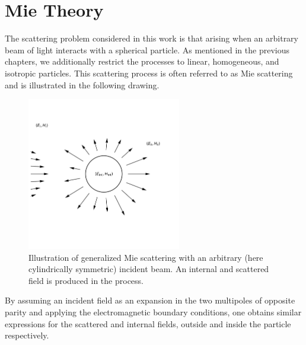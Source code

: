 \section{Mie Theory}

The scattering problem considered in this work is that arising when an arbitrary beam of light interacts with a spherical particle. As mentioned in the previous chapters, we additionally restrict the processes to linear, homogeneous, and isotropic particles. This scattering process is often referred to as Mie scattering and is illustrated in the following drawing.

\begin{figure}
    \includegraphics[trim={0 1cm 0 1cm},clip,width=0.6\textwidth]{Figures/figure.png}
    \caption{Illustration of generalized Mie scattering with an arbitrary (here cylindrically symmetric) incident beam. An internal and scattered field is produced in the process.}
    \label{fig:glmt}
\end{figure}

By assuming an incident field as an expansion in the two multipoles of opposite parity and applying the electromagnetic boundary conditions, one obtains similar expressions for the scattered and internal fields, outside and inside the particle respectively.

